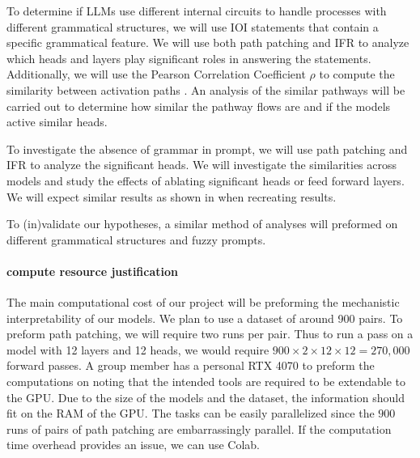 \documentclass[11pt,a4paper]{article}
\newcommand{\black}{\color{black}{}}
\newcommand{\mb}{\color{black}{}}
\begin{document}
\mb 
To determine if LLMs use different internal circuits to handle processes with different grammatical structures, we will use IOI statements that contain a specific grammatical feature. We will use both path patching and IFR to analyze which heads and layers play significant roles in answering the statements. Additionally, we will use the Pearson Correlation Coefficient $\rho$ to compute the similarity between activation paths \cite{freedman2007statistics}. An analysis of the similar pathways will be carried out to determine how similar the pathway flows are and if the models active similar heads. 

To investigate the absence of grammar in prompt, we will use path patching and IFR to analyze the significant heads. We will investigate the similarities across models and study the effects of ablating significant heads or feed forward layers. We will expect similar results as shown in \cite{ZYZEP25} when recreating results. 

 To (in)validate our hypotheses, a similar method of analyses will preformed on different grammatical structures and fuzzy prompts.


\black 
\paragraph{compute resource justification}


\mb
The main computational cost of our project will be preforming the mechanistic interpretability of our models. We plan to use a dataset of around 900 pairs. To preform path patching, we will require two runs per pair. Thus to run a pass on a model with 12 layers and 12 heads, we would require $900\times2\times12\times12 = 270,000$ forward passes. A group member has a personal RTX 4070 to preform the computations on noting that the intended tools are required to be extendable to the GPU. Due to the size of the models and the dataset, the information should fit on the RAM of the GPU. The tasks can be easily parallelized since the $900$ runs of pairs of path patching are embarrassingly parallel. If the computation time overhead provides an issue, we can use Colab. 
\end{document}
